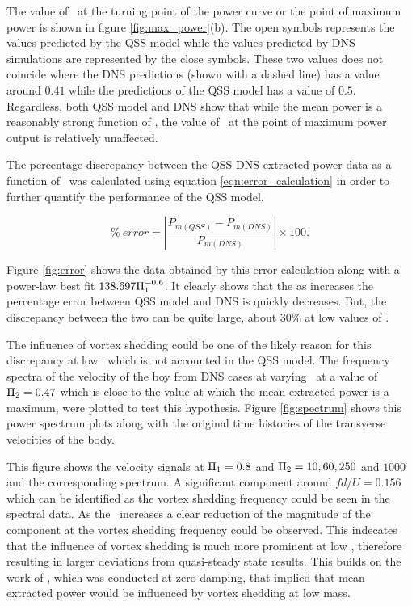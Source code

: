 The value of \massdamp\ at the turning point  of the power curve or the point of maximum power is shown in figure \ref{fig:max_power}(b). The open symbols represents the values predicted by the QSS model while the values predicted by DNS simulations are represented by the close symbols. These two values does not coincide where the DNS predictions (shown with a dashed line) has a value around $0.41$ while the predictions of the QSS model has a value of $0.5$. Regardless, both QSS model and DNS show that while the mean power is a reasonably strong function of \massstiff, the value of \massdamp\ at the point of maximum power output is relatively unaffected.


The percentage discrepancy between the QSS DNS  extracted power data as a function of \massstiff\ was calculated using equation \ref{eqn:error_calculation} in order to further quantify the performance of the QSS model.  
 
\begin{equation}   \label{eqn:error_calculation} 
\% \ error=\left|{\frac{P_{m(QSS)} - P_{m(DNS)}}{P_{m(DNS)}}}\right| \times 100.
\end{equation}

Figure \ref{fig:error} shows the data obtained by this error calculation along with a power-law best fit $138.697\Pi_1^{-0.6}$. It clearly shows that the as \massstiff increases the percentage error between QSS model and DNS is quickly decreases. But, the discrepancy between the two can be quite large, about $30\%$ at low values of \massstiff.



The influence of vortex shedding could be one of the likely reason for this discrepancy at low \massstiff\ which is not accounted in the QSS model. The frequency spectra of the velocity of the boy from DNS cases at varying \massstiff\  at a value of $\Pi_2=0.47$ which is close to the value at which the mean extracted power is a maximum, were plotted to test this hypothesis. Figure \ref{fig:spectrum} shows this power spectrum plots along with the original time histories of the transverse velocities of the body. 





This figure shows the  velocity signals at $\Pi_1=0.8$ and $\Pi_2= 10, 60, 250$ and $1000$ and the corresponding spectrum. A significant component around $fd/U=0.156$ which can be identified as the vortex shedding frequency could be seen in the spectral data. As the \massstiff\ increases a clear reduction of the magnitude of the component at the  vortex shedding frequency could be observed. This indecates that the influence of vortex shedding is much more prominent at low \massstiff,  therefore resulting in larger deviations from quasi-steady state results. This builds on the work of \cite{Joly2012}, which was conducted at zero damping, that implied that mean extracted power would be influenced by vortex shedding at low mass.

